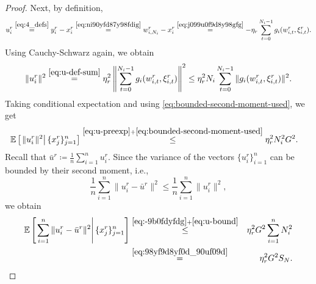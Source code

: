 \documentclass{article}
\newcommand{\eqdef}{\coloneqq}
\newcommand{\ExpCond}[2]{{\mathbb{E}}\left[\left.#1\right\vert#2\right]}
\theoremstyle{plain}
\theoremstyle{definition}
\begin{document}
\begin{proof}
Next, by definition,
\begin{equation}
u_i^r
\overset{\eqref{eq:4_defs}}{=} 
y_i^r-x_i^r 
\overset{\eqref{eq:ni90yfd87y98fdig}}{=}
w_{i,N_i}^r - x_i^r
\overset{\eqref{eq:j099u0f9d8y98gfg}}{=}
-\eta_r \sum_{t=0}^{N_i-1} g_i(w_{i,t}^r,\xi_{i,t}^r).
\label{eq:u-def-sum}
\end{equation}
Using Cauchy-Schwarz again, we obtain
\begin{eqnarray}
\|u_i^r\|^2
\overset{\eqref{eq:u-def-sum}}{=}
\eta_r^2 \left\|\sum_{t=0}^{N_i-1} g_i(w_{i,t}^r,\xi_{i,t}^r)\right\|^2
\leq
\eta_r^2 N_i \sum_{t=0}^{N_i-1} \|g_i(w_{i,t}^r,\xi_{i,t}^r)\|^2.
\label{eq:u-preexp}
\end{eqnarray}
Taking conditional expectation and using \eqref{eq:bounded-second-moment-used}, we get
\begin{align}
\ExpCond{\|u_i^r\|^2}{\{x_j^r\}_{j=1}^n}
&\overset{\eqref{eq:u-preexp}+\eqref{eq:bounded-second-moment-used}}{\le}
\eta_r^2 N_i^2 G^2.
\label{eq:u-bound}
\end{align}
Recall that \(\bar u^r \eqdef \frac{1}{n}\sum_{i=1}^n u_i^r\). Since the variance of the vectors \(\{u_i^r\}_{i=1}^n\) can be bounded by their second moment, i.e., 
\begin{equation}
\frac{1}{n}\sum_{i=1}^n \|u_i^r-\bar u^r\|^2
\leq
\frac{1}{n}\sum_{i=1}^n \|u_i^r\|^2,
\label{eq:-9b0fdyfdg}
\end{equation}
we obtain
\begin{eqnarray*}
\ExpCond{\sum_{i=1}^n \|u_i^r-\bar u^r\|^2}{\{x_j^r\}_{j=1}^n}
&\overset{\eqref{eq:-9b0fdyfdg}+\eqref{eq:u-bound}}{\le}&
\eta_r^2 G^2 \sum_{i=1}^n N_i^2
\notag\\
&\overset{\eqref{eq:98yf9d8yf0d_90uf09d}}{=}&
\eta_r^2 G^2 S_N.
\end{eqnarray*}


\end{proof}
\end{document}
